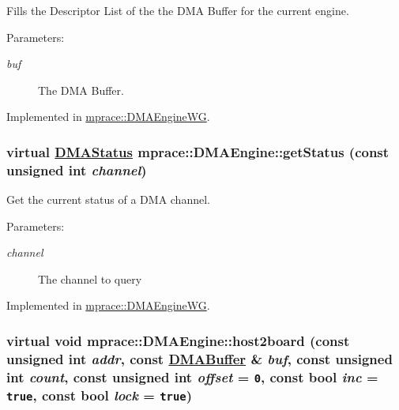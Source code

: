 Fills the Descriptor List of the the DMA Buffer for the current engine. 

\begin{Desc}
\item[Parameters:]
\begin{description}
\item[{\em buf}]The DMA Buffer.\end{description}
\end{Desc}


Implemented in \hyperlink{classmprace_1_1DMAEngineWG_a6}{mprace::DMAEngine\-WG}.\hypertarget{classmprace_1_1DMAEngine_a1}{
\subsubsection[getStatus]{\setlength{\rightskip}{0pt plus 5cm}virtual \hyperlink{classmprace_1_1DMAEngine_w3}{DMAStatus} mprace::DMAEngine::get\-Status (const unsigned int {\em channel})}}
\label{classmprace_1_1DMAEngine_a1}


Get the current status of a DMA channel. 

\begin{Desc}
\item[Parameters:]
\begin{description}
\item[{\em channel}]The channel to query\end{description}
\end{Desc}


Implemented in \hyperlink{classmprace_1_1DMAEngineWG_a2}{mprace::DMAEngine\-WG}.\hypertarget{classmprace_1_1DMAEngine_a3}{
\subsubsection[host2board]{\setlength{\rightskip}{0pt plus 5cm}virtual void mprace::DMAEngine::host2board (const unsigned int {\em addr}, const \hyperlink{classmprace_1_1DMABuffer}{DMABuffer} \& {\em buf}, const unsigned int {\em count}, const unsigned int {\em offset} = {\tt 0}, const bool {\em inc} = {\tt true}, const bool {\em lock} = {\tt true})}}
\label{classmprace_1_1DMAEngine_a3}


